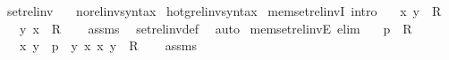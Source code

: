 \begin{isabellebody}
\ set{\isacharunderscore}{\kern0pt}rel{\isacharunderscore}{\kern0pt}inv\ {\isacharparenleft}{\kern0pt}{\isachardoublequoteopen}{\isacharparenleft}{\kern0pt}{\isacharunderscore}{\kern0pt}{\isasyminverse}{\isacharparenright}{\kern0pt}{\isachardoublequoteclose}\ {\isacharbrackleft}{\kern0pt}{}{}{}{}{\isacharbrackright}{\kern0pt}{\isacharparenright}{\kern0pt}\isanewline
{}\isamarkupfalse%
\isanewline
\isanewline
{}\isamarkupfalse%
\ no{\isacharunderscore}{\kern0pt}rel{\isacharunderscore}{\kern0pt}inv{\isacharunderscore}{\kern0pt}syntax\isanewline
{}\isamarkupfalse%
\ hotg{\isacharunderscore}{\kern0pt}rel{\isacharunderscore}{\kern0pt}inv{\isacharunderscore}{\kern0pt}syntax\isanewline
\isanewline
{}\isamarkupfalse%
\ mem{\isacharunderscore}{\kern0pt}set{\isacharunderscore}{\kern0pt}rel{\isacharunderscore}{\kern0pt}invI\ {\isacharbrackleft}{\kern0pt}intro{\isacharbrackright}{\kern0pt}{\isacharcolon}{\kern0pt}\isanewline
\ \ \ {\isachardoublequoteopen}{\isasymlangle}x{\isacharcomma}{\kern0pt}\ y{\isasymrangle}\ {\isasymin}\ R{\isachardoublequoteclose}\isanewline
\ \ \ {\isachardoublequoteopen}{\isasymlangle}y{\isacharcomma}{\kern0pt}\ x{\isasymrangle}\ {\isasymin}\ R{\isasyminverse}{\isachardoublequoteclose}\isanewline
%
\isadelimproof
\ \ %
\endisadelimproof
%
\isatagproof
{}\isamarkupfalse%
\ assms\ \isamarkupfalse%
\ set{\isacharunderscore}{\kern0pt}rel{\isacharunderscore}{\kern0pt}inv{\isacharunderscore}{\kern0pt}def\ \isamarkupfalse%
\ auto%
\endisatagproof
{\isafoldproof}%
%
\isadelimproof
\isanewline
%
\endisadelimproof
\isanewline
{}\isamarkupfalse%
\ mem{\isacharunderscore}{\kern0pt}set{\isacharunderscore}{\kern0pt}rel{\isacharunderscore}{\kern0pt}invE\ {\isacharbrackleft}{\kern0pt}elim{\isacharbang}{\kern0pt}{\isacharbrackright}{\kern0pt}{\isacharcolon}{\kern0pt}\isanewline
\ \ \ {\isachardoublequoteopen}p\ {\isasymin}\ R{\isasyminverse}{\isachardoublequoteclose}\isanewline
\ \ \ x\ y\ \ {\isachardoublequoteopen}p\ {\isacharequal}{\kern0pt}\ {\isasymlangle}y{\isacharcomma}{\kern0pt}\ x{\isasymrangle}{\isachardoublequoteclose}\ {\isachardoublequoteopen}{\isasymlangle}x{\isacharcomma}{\kern0pt}\ y{\isasymrangle}\ {\isasymin}\ R{\isachardoublequoteclose}\isanewline
%
\isadelimproof
\ \ %
\endisadelimproof
%
\isatagproof
{}\isamarkupfalse%
\ assms\ \isamarkupfalse%

\end{isabellebody}
